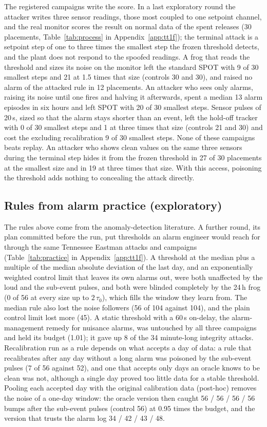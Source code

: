 \documentclass[sigconf,review,anonymous]{acmart}
\begin{document}
The registered campaigns write the score. In a last exploratory round the attacker writes three sensor
readings, those most coupled to one setpoint channel, and the real monitor scores the result on normal
data of the spent releases (30 placements, Table~\ref{tab:process} in Appendix~\ref{app:tt1f}); the terminal attack is a setpoint
step of one to three times the smallest step the frozen threshold detects, and the plant does not
respond to the spoofed readings. A frog that reads the threshold and sizes its noise on the monitor
left the standard SPOT with 9 of 30 smallest steps and 21 at 1.5 times that size (controls 30 and 30),
and raised no alarm of the attacked rule in 12 placements. An attacker who sees only alarms, raising
its noise until one fires and halving it afterwards, spent a median 13 alarm episodes in six hours
and left SPOT with 20 of 30 smallest steps. Sensor pulses of 20\,s, sized so that the alarm stays shorter
than an event, left the hold-off tracker with 0 of 30 smallest steps and 1 at three times that size
(controls 21 and 30) and cost the excluding recalibration 9 of 30 smallest steps. None of these
campaigns beats replay. An attacker who shows clean values on the same three sensors during the
terminal step hides it from the frozen threshold in 27 of 30 placements at the smallest size and in
19 at three times that size. With this access, poisoning the threshold adds nothing to concealing
the attack directly.

\subsection{Rules from alarm practice (exploratory)}
\label{sec:practice}

The rules above come from the anomaly-detection literature. A further round, its plan committed before
the run, put thresholds an alarm engineer would reach for through the same Tennessee Eastman attacks and
campaigns (Table~\ref{tab:practice} in Appendix~\ref{app:tt1f}). A threshold at the median plus a
multiple of the median absolute deviation of the last day, and an exponentially weighted control limit
that leaves its own alarms out, were both unaffected by the loud and the sub-event pulses, and both were
blinded completely by the 24\,h frog (0 of 56 at every size up to $2\,\tau_0$), which fills the window
they learn from. The median rule also lost the noise followers (56 of 104 against 104), and the plain
control limit lost more (45). A static threshold with a 60\,s on-delay, the alarm-management remedy for
nuisance alarms, was untouched by all three campaigns and held its budget (1.01); it gave up 8 of the 34
minute-long integrity attacks. Recalibration run as a rule depends on what accepts a day of data: a rule
that recalibrates after any day without a long alarm was poisoned by the sub-event pulses (7 of 56
against 52), and one that accepts only days an oracle knows to be clean was not, although a single day proved
too little data for a stable threshold. Pooling each accepted day with the original calibration data (post-hoc) removes the noise of a one-day window:
the oracle version then caught 56 / 56 / 56 / 56 bumps after the sub-event pulses (control 56) at
0.95 times the budget, and the version that trusts the alarm log 34 / 42 / 43 / 48.
\end{document}
